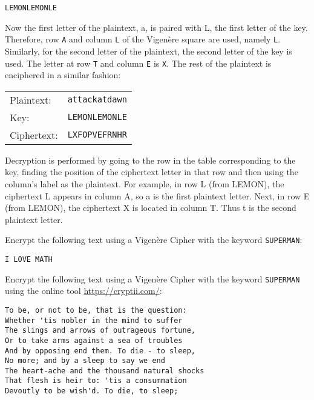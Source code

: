 \documentclass[11pt,a4paper]{report}
\begin{document}
\verb|LEMONLEMONLE|



Now the first letter of the plaintext, a, is paired with L, the first letter of the key. Therefore, row \verb|A| and column \verb|L| of the Vigenère square are used, namely \verb|L|. Similarly, for the second letter of the plaintext, the second letter of the key is used. The letter at row \verb|T| and column \verb|E| is \verb|X|. The rest of the plaintext is enciphered in a similar fashion:
\begin{center}
\begin{tabular}{ll}
Plaintext: & 	\verb|attackatdawn| \\
Key: & 	\verb|LEMONLEMONLE| \\
Ciphertext:	 & \verb|LXFOPVEFRNHR|
\end{tabular}
\end{center}



Decryption is performed by going to the row in the table corresponding to the key, finding the position of the ciphertext letter in that row and then using the column's label as the plaintext. For example, in row L (from LEMON), the ciphertext L appears in column A, so a is the first plaintext letter. Next, in row E (from LEMON), the ciphertext X is located in column T. Thus t is the second plaintext letter.

\begin{ex}
Encrypt the following text using a Vigenère Cipher with the keyword \verb|SUPERMAN|:
\begin{verbatim}
I LOVE MATH
\end{verbatim}

\end{ex}

\begin{ex}
Encrypt the following text using a Vigenère Cipher with the keyword \verb|SUPERMAN| using the online tool \url{https://cryptii.com/}:
\begin{verbatim}
To be, or not to be, that is the question:
Whether 'tis nobler in the mind to suffer
The slings and arrows of outrageous fortune,
Or to take arms against a sea of troubles
And by opposing end them. To die - to sleep,
No more; and by a sleep to say we end
The heart-ache and the thousand natural shocks
That flesh is heir to: 'tis a consummation
Devoutly to be wish'd. To die, to sleep;
\end{verbatim}
\end{ex}
\end{document}
